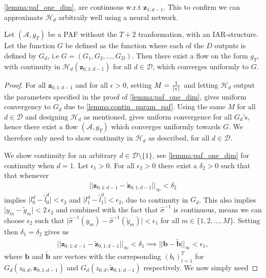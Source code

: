 \cref{lemma:paf_one_dim}, are continuous w.r.t \(\bm z_{1:d-1}\). This to confirm we can approximate \(\mathcal{H}_d\) arbitraily well using a neural network.
\begin{lemma}\label{lemma:contin_param_paf}
    Let \((\mathcal{A}, g_T)\) be a PAF without the \(T+2\) tranformation, with an IAR-structure. Let the function \(G\) be defined as the function
    where each of the \(D\) outputs is defined by \(G_d\), i.e \(G = (G_1, G_2, \dots, G_D)\). Then there exist a flow on the form \(g_T\), with
    continuity in \(\mathcal{H}_d(\bm z_{0,1:d-1})\) for all \(d \in \mathcal{D}\), which 
    converges uniformly to \(G\). 
\end{lemma}
\begin{proof}
    For all \(\bm z_{0,1:d-1}\) and for all \(\epsilon > 0\), setting \(M = \frac{1}{\lceil\epsilon\rceil}\) and 
    letting \(\mathcal{H}_d\) output the parameters specified in the proof of 
    \cref{lemma:paf_one_dim},  gives uniform convergency to \(G_d\) due to \cref{lemma:contin_param_paf}.
    Using the same \(M\) for all \(d \in \mathcal{D}\) and designing \(\mathcal{H}_d\) as mentioned, gives uniform convergence for all \(G_d\)'s, hence
    there exist a flow \((\mathcal{A}, g_T)\) which converges uniformly towards \(G\). We therefore only need to show continuity in \(\mathcal{H}_d\) as 
    described, for all \(d \in \mathcal{D}\).

    We show continuity for an arbitrary \(d \in \mathcal{D}\setminus \{1\}\), see \cref{lemma:paf_one_dim} for continuity when \(d=1\). 
    Let \(\epsilon_1 > 0\). For all \(\epsilon_2 > 0\) there exist a \(\delta_2 > 0\) such that that whenever
    \begin{align*}
        \lvert\lvert \bm z_{0,1:d-1} - \tilde{\bm z}_{0,1:d-1}\rvert\rvert_{\infty} < \delta_2
    \end{align*}
    implies \(\lvert l_0^d - \tilde{l}_0^d\rvert < \epsilon_2\) and \(\lvert l_1^d - \tilde{l}_1^d\rvert < \epsilon_2\), 
    due to continuity in \(G_d\). This also implies \(\lvert y_m - \tilde y_m \rvert < 2 \,\epsilon_2\) and combined with the fact that
    \(\hat{\sigma}^{-1}\) is continuous, means we can choose \(\epsilon_2\) such that 
    \(\lvert \hat{\sigma}^{-1}(y_m) - \hat{\sigma}^{-1}(\tilde y_m)\rvert < \epsilon_1\) for all \(m \in \{1,2,\dots,M\}\). 
    Setting then \(\delta_1 = \delta_2\) gives us
    \begin{align*}
        \lvert\lvert \bm z_{0,1:d-1} - \tilde{\bm z}_{0,1:d-1}\rvert\rvert_{\infty} < \delta_1
        \implies \lvert\lvert \bm b - \tilde{\bm b}\rvert\rvert_{\infty} < \epsilon_1,
    \end{align*}
    where \(\bm b\) and \(\tilde{\bm b}\) are vectors with the correpsonding \((b_t)_{t=1}^T\) for \(G_d(z_{0,d}, \bm z_{0,1:d-1})\) and 
    \(G_d(z_{0,d}, \tilde{\bm z}_{0,1:d-1})\) respectively. We now simply need 
 \end{proof}






